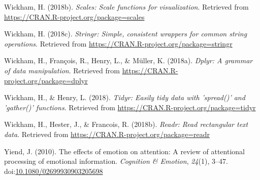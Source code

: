 \documentclass[man,floatsintext]{apa6}
\begin{document}
\leavevmode\hypertarget{ref-R-scales}{}%
Wickham, H. (2018b). \emph{Scales: Scale functions for visualization}. Retrieved from \url{https://CRAN.R-project.org/package=scales}

\leavevmode\hypertarget{ref-R-stringr}{}%
Wickham, H. (2018c). \emph{Stringr: Simple, consistent wrappers for common string operations}. Retrieved from \url{https://CRAN.R-project.org/package=stringr}

\leavevmode\hypertarget{ref-R-dplyr}{}%
Wickham, H., François, R., Henry, L., \& Müller, K. (2018a). \emph{Dplyr: A grammar of data manipulation}. Retrieved from \url{https://CRAN.R-project.org/package=dplyr}

\leavevmode\hypertarget{ref-R-tidyr}{}%
Wickham, H., \& Henry, L. (2018). \emph{Tidyr: Easily tidy data with 'spread()' and 'gather()' functions}. Retrieved from \url{https://CRAN.R-project.org/package=tidyr}

\leavevmode\hypertarget{ref-R-readr}{}%
Wickham, H., Hester, J., \& Francois, R. (2018b). \emph{Readr: Read rectangular text data}. Retrieved from \url{https://CRAN.R-project.org/package=readr}

\leavevmode\hypertarget{ref-Yiend2010}{}%
Yiend, J. (2010). The effects of emotion on attention: A review of attentional processing of emotional information. \emph{Cognition \& Emotion}, \emph{24}(1), 3--47. doi:\href{https://doi.org/10.1080/02699930903205698}{10.1080/02699930903205698}

\endgroup
\end{document}
